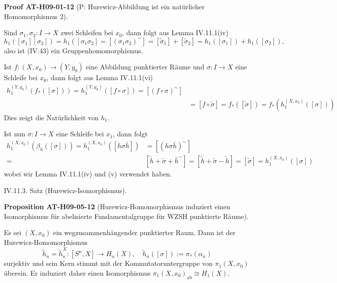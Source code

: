 \documentclass[10pt, letterpaper]{article}
\newcommand{\CustomHeading}[3]{%
  \par\medskip\noindent%
  \textbf{#1 #2} \textnormal{(#3)}.\enskip%
}
\newenvironment{PROP}[2]{\begin{unitbox}\CustomHeading{Proposition}{#1}{#2}}{\end{unitbox}}
\newenvironment{PROOF}[2]{\begin{unitbox}\CustomHeading{Proof}{#1}{#2}}{\end{unitbox}}
\begin{document}
\begin{PROOF}{AT-H09-01-12}{P: Hurewicz-Abbildung ist ein natürlicher Homomorphismus 2}
Sind $\sigma_1, \sigma_2: I \rightarrow X$ zwei Schleifen bei $x_0$, dann folgt aus Lemma IV.11.1(iv)
$$
h_1\left(\left[\sigma_1\right]\left[\sigma_2\right]\right)=h_1\left(\left[\sigma_1 \sigma_2\right]=\left[\left(\sigma_1 \sigma_2\right)^{\sim}\right]=\left[\tilde{\sigma}_1\right]+\left[\tilde{\sigma}_2\right]=h_1\left(\left[\sigma_1\right]\right)+h_1\left(\left[\sigma_2\right]\right),\right.
$$
also ist (IV.43) ein Gruppenhomomorphismus. 

Ist $f:\left(X, x_0\right) \rightarrow\left(Y, y_0\right)$ eine Abbildung punktierter Räume und $\sigma: I \rightarrow X$ eine Schleife bei $x_0$, dann folgt aus Lemma IV.11.1(vi)
$$
\begin{aligned}
h_1^{\left(Y, y_0\right)}\left(f_*([\sigma])\right)=h_1^{\left(Y, y_0\right)}([f \circ \sigma])=\left[(f \circ \sigma)^{\sim}\right] & \\
& =[f \circ \tilde{\sigma}]=f_*([\tilde{\sigma}])=f_*\left(h_1^{\left(X, x_0\right)}([\sigma])\right)
\end{aligned}
$$
Dies zeigt die Natürlichkeit von $h_1$. 

Ist nun $\sigma: I \rightarrow X$ eine Schleife bei $x_1$, dann folgt
$$
\begin{aligned}
h_1^{\left(X, x_0\right)}\left(\beta_h([\sigma])\right)=h_1^{\left(X, x_0\right)}([h \sigma \bar{h}]) & =\left[(h \sigma \bar{h})^{\sim}\right] \\
= & {\left[\tilde{h}+\tilde{\sigma}+\bar{h}^{\sim}\right]=[\tilde{h}+\tilde{\sigma}-\tilde{h}]=[\tilde{\sigma}]=h_1^{\left(X, x_0\right)}([\sigma]) }
\end{aligned}
$$
wobei wir Lemma IV.11.1(iv) und (v) verwendet haben.
\end{PROOF}


IV.11.3. Satz (Hurewicz-Isomorphismus). 


\begin{PROP}{AT-H09-05-12}{Hurewicz-Homomorphismus induziert einen Isomorphismus für abelisierte Fundamentalgruppe für WZSH punktierte Räume}
Es sei $(X, x_0)$ ein wegzusammenhängender punktierter Raum. Dann ist der Hurewicz-Homomorphismus 
$$\tilde{h}_n=\tilde{h}_n^X:\left[S^n, X\right] \rightarrow H_n(X), \quad \tilde{h}_n([\sigma]):=\sigma_*\left(\alpha_n\right)$$
surjektiv und sein Kern stimmt mit der Kommutatoruntergruppe von $\pi_1\left(X, x_0\right)$ überein. Er induziert daher einen Isomorphismus $\pi_1\left(X, x_0\right)_{\mathrm{ab}} \cong H_1(X)$.
\end{PROP}
\end{document}
